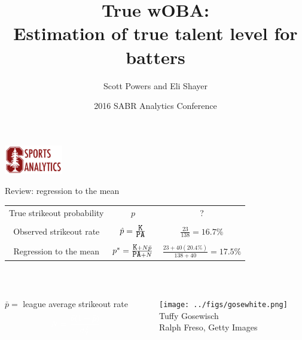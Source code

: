 \documentclass{beamer}
\title{True wOBA:\\
    \small Estimation of true talent level for batters}
\author{Scott Powers and Eli Shayer}
\institute{Stanford University}
\date{2016 SABR Analytics Conference}
\begin{document}
\begin{frame}
\titlepage
\hfill\includegraphics[width = 1in]{../figs/ssac.png}
\end{frame}

\begin{frame}{Review: regression to the mean}
\begin{tabular}{ccc}
True strikeout probability  & $p$ & {\color{white}?}\\
    \vspace{2mm}\\
Observed strikeout rate     & $\hat p = \frac{\mbox{\tt K}}{\mbox{\tt PA}}$
    & {\color{white}$\frac{23}{138} = 16.7\%$}\\
    \vspace{2mm}\\
Regression to the mean      & $p^* = \frac{\mbox{\tt K} + N\bar p}
    {\mbox{\tt PA} + N}$ &
    {\color{white}$\frac{23 + 40(20.4\%)}{138 + 40} = 17.5\%$}
\end{tabular}\\
\vspace{4mm}
\begin{columns}
\begin{column}{0.6\textwidth}
\hfill {\small $\bar p =$ league average strikeout rate}\\
\vspace{1cm}
$${\color{white} N = \frac{\bar p(1 - \bar p)}{\sigma^2_T}}$$
\end{column}
\begin{column}{0.4\textwidth}
\centering
\texttt{[image: ../figs/gosewhite.png]}\\
\large {\color{white} Tuffy Gosewisch}\\
{\color{white}\tiny Ralph Freso, Getty Images}
\end{column}
\end{columns}
\end{frame}
\end{document}
